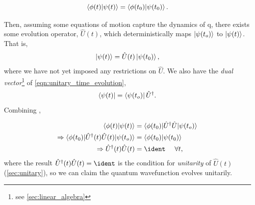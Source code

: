 \begin{equation}
    \label{eqn:conservation_simularity}
    \braket{\phi(t) | \psi(t)} = \braket{\phi(t_0) | \psi(t_0)}.
\end{equation}

Then, assuming some equations of motion capture the dynamics of \gls{q}, 
    there exists some evolution operator, $\hat{U}(t)$, which deterministically maps $\ket{\psi(t_o)}$ to $\ket{\psi(t)}$.
That is, 
\begin{equation}
    \label{eqn:unitary_time_evolution}
    \ket{\psi(t)} = \hat{U}(t) \ket{\psi(t_0)},
\end{equation}
    where we have not yet imposed any restrictions on $\hat{U}$. 
We also have the \emph{dual vector}\footnote{see \cref{sec:linear_algebra}} of \cref{eqn:unitary_time_evolution},
\begin{equation}
    \label{eqn:dual_unitary_evolution}
    \bra{\psi(t)} = \bra{\psi(t_o)}\hat{U}^{\dagger}.
\end{equation} 
Combining , 

\begin{align}
    \begin{split}
        \braket{\phi(t) | \psi(t)} &= \braket{ \phi(t_0) | \hat{U}^{\dag} \hat{U}| \psi(t_o) }
        \\
        \Rightarrow \braket{ \phi(t_0) | \hat{U}^{\dag}(t) \hat{U}(t) | \psi(t_o) } &= \braket{\phi(t_0) | \psi(t_0)}
        \\
        \Rightarrow \hat{U}^{\dag}(t) \hat{U}(t) &= \ident \ \ \ \ \forall t,
    \end{split}
\end{align}
where the result $\hat{U}^{\dag}(t) \hat{U}(t) = \ident$ is the condition for \emph{unitarity} of $\hat{U}(t)$ (\cref{sec:unitary}), 
    so we can claim the quantum wavefunction evolves unitarily. 
\par 

